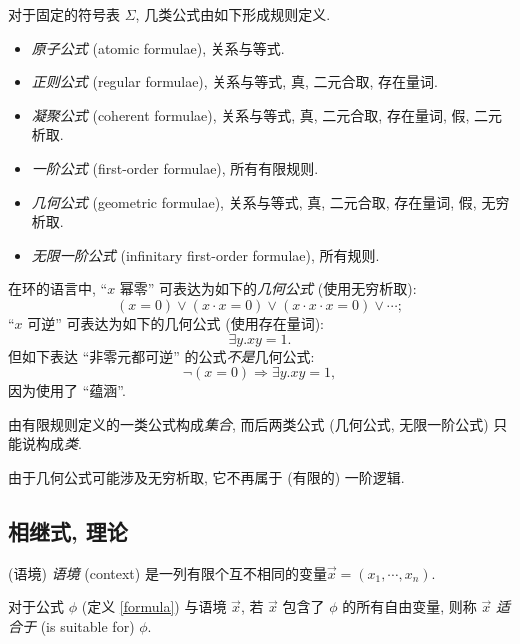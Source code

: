 \begin{definition}
	[label={kinds-of-formulae}]
	{}
	对于固定的符号表 $\Sigma$,
	几类公式由如下形成规则定义.
	\begin{itemize}
		\item \emph{原子公式} (atomic formulae), 关系与等式.
		\item \emph{正则公式} (regular formulae), 关系与等式, 真, 二元合取, 存在量词.
		\item \emph{凝聚公式} (coherent formulae), 关系与等式, 真, 二元合取, 存在量词, 假, 二元析取.
		\item \emph{一阶公式} (first-order formulae), 所有有限规则.
		\item \emph{几何公式} (geometric formulae), 关系与等式, 真, 二元合取, 存在量词, 假, 无穷析取.
		\item \emph{无限一阶公式} (infinitary first-order formulae), 所有规则.
	\end{itemize}
\end{definition}

\begin{example}
	{}
	在环的语言中, ``$x$ 幂零'' 可表达为如下的\emph{几何公式} (使用无穷析取):
	$$
	(x=0)\lor (x\cdot x=0) \lor (x\cdot x\cdot x=0)\lor\cdots;
	$$
	``$x$ 可逆'' 可表达为如下的几何公式 (使用存在量词):
	$$
	\exists y. xy= 1.
	$$
	但如下表达 ``非零元都可逆'' 的公式\emph{不是}几何公式:
	$$
	\neg(x=0) \Rightarrow \exists y.xy=1,
	$$
	因为使用了 ``蕴涵''.
\end{example}

\begin{remark}
	{}
	由有限规则定义的一类公式构成\emph{集合}, 而后两类公式 (几何公式, 无限一阶公式) 只能说构成\emph{类}.
	
	由于几何公式可能涉及无穷析取, 它不再属于 (有限的) 一阶逻辑.
\end{remark}

\subsection{相继式, 理论}

\begin{definition}
	{(语境)}
	\emph{语境} (context) 是一列有限个互不相同的变量\footnotemark $\vec x = (x_1,\cdots,x_n)$.
	
	对于公式 $\phi$ (定义 \ref{formula}) 与语境 $\vec x$, 若 $\vec x$ 包含了 $\phi$ 的所有自由变量, 则称 $\vec x$ \emph{适合于} (is suitable for) $\phi$.
\end{definition}


